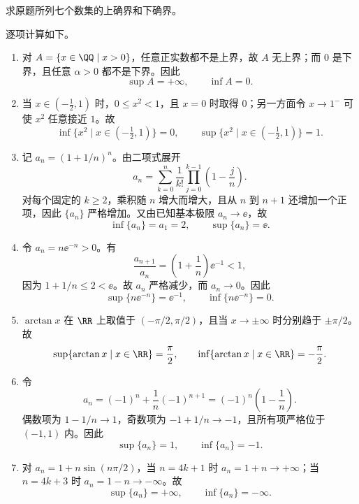 \begin{xexercise}[3.1.3 练习题 4]
求原题所列七个数集的上确界和下确界。
\end{xexercise}
\begin{xsolution}
逐项计算如下。
\begin{enumerate}[label=(\arabic*)]
  \item 对 $A=\{x\in\QQ\mid x>0\}$，任意正实数都不是上界，故 $A$ 无上界；而 $0$ 是下界，且任意 $\alpha>0$ 都不是下界。因此
  \[
    \sup A=+\infty,\qquad \inf A=0.
  \]

  \item 当 $x\in(-\frac12,1)$ 时，$0\leqslant x^2<1$，且 $x=0$ 时取得 $0$；另一方面令 $x\to1^-$ 可使 $x^2$ 任意接近 $1$。故
  \[
    \inf\{x^2\mid x\in(-\tfrac12,1)\}=0,\qquad
    \sup\{x^2\mid x\in(-\tfrac12,1)\}=1.
  \]

  \item 记 $a_n=(1+1/n)^n$。由二项式展开
  \[
    a_n=\sum_{k=0}^{n}\frac1{k!}\prod_{j=0}^{k-1}\left(1-\frac{j}{n}\right).
  \]
  对每个固定的 $k\geqslant2$，乘积随 $n$ 增大而增大，且从 $n$ 到 $n+1$ 还增加一个正项，因此 $\{a_n\}$ 严格增加。又由已知基本极限 $a_n\to\ee$，故
  \[
    \inf\{a_n\}=a_1=2,
    \qquad
    \sup\{a_n\}=\ee.
  \]

  \item 令 $a_n=n\ee^{-n}>0$。有
  \[
    \frac{a_{n+1}}{a_n}=\left(1+\frac1n\right)\ee^{-1}<1,
  \]
  因为 $1+1/n\leqslant2<\ee$。故 $a_n$ 严格减少，而 $a_n\to0$。因此
  \[
    \sup\{n\ee^{-n}\}=\ee^{-1},\qquad
    \inf\{n\ee^{-n}\}=0.
  \]

  \item $\arctan x$ 在 $\RR$ 上取值于 $(-\pi/2,\pi/2)$，且当 $x\to\pm\infty$ 时分别趋于 $\pm\pi/2$。故
  \[
    \sup\{\arctan x\mid x\in\RR\}=\frac\pi2,
    \qquad
    \inf\{\arctan x\mid x\in\RR\}=-\frac\pi2.
  \]

  \item 令
  \[
    a_n=(-1)^n+\frac1n(-1)^{n+1}=(-1)^n\left(1-\frac1n\right).
  \]
  偶数项为 $1-1/n\to1$，奇数项为 $-1+1/n\to-1$，且所有项严格位于 $(-1,1)$ 内。因此
  \[
    \sup\{a_n\}=1,
    \qquad
    \inf\{a_n\}=-1.
  \]

  \item 对 $a_n=1+n\sin(n\pi/2)$，当 $n=4k+1$ 时 $a_n=1+n\to+\infty$；当 $n=4k+3$ 时 $a_n=1-n\to-\infty$。故
  \[
    \sup\{a_n\}=+\infty,
    \qquad
    \inf\{a_n\}=-\infty.
  \]
\end{enumerate}
\end{xsolution}

